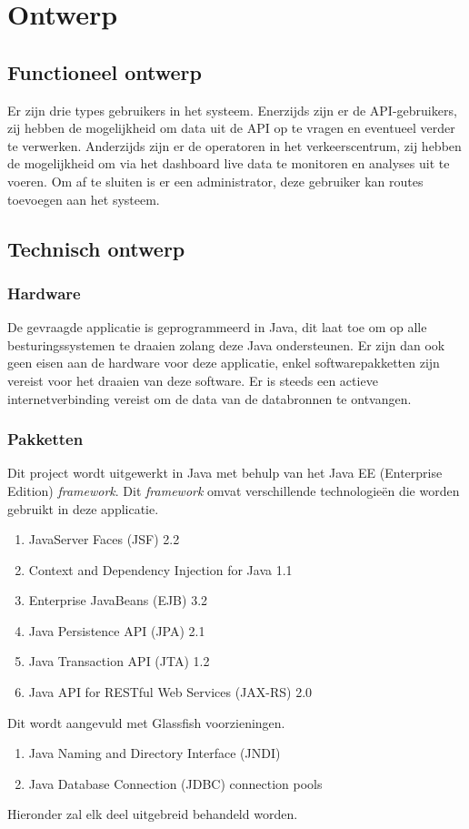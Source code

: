 \documentclass[ps,a4paper,oneside]{report}
\begin{document}
\chapter{Ontwerp}
\section{Functioneel ontwerp}
Er zijn drie types gebruikers in het systeem. Enerzijds zijn er de API-gebruikers, zij hebben de mogelijkheid om data uit de API op te vragen en eventueel verder te verwerken. Anderzijds zijn er de operatoren in het verkeerscentrum, zij hebben de mogelijkheid om via het dashboard live data te monitoren en analyses uit te voeren. Om af te sluiten is er een administrator, deze gebruiker kan routes toevoegen aan het systeem.
\section{Technisch ontwerp}
\subsection{Hardware}
De gevraagde applicatie is geprogrammeerd in Java, dit laat toe om op alle besturingssystemen te draaien zolang deze Java ondersteunen. Er zijn dan ook geen eisen aan de hardware voor deze applicatie, enkel softwarepakketten zijn vereist voor het draaien van deze software. Er is steeds een actieve internetverbinding vereist om de data van de databronnen te ontvangen.
\subsection{Pakketten}
Dit project wordt uitgewerkt in Java met behulp van het Java EE (Enterprise Edition) \textit{framework}. Dit \textit{framework} omvat verschillende technologie\"en die worden gebruikt in deze applicatie.
\begin{enumerate}	
	\item JavaServer Faces (JSF) 2.2
	\item Context and Dependency Injection for Java 1.1
	\item Enterprise JavaBeans (EJB) 3.2
	\item Java Persistence API (JPA) 2.1
	\item Java Transaction API (JTA) 1.2
	\item Java API for RESTful Web Services (JAX-RS) 2.0
\end{enumerate}
Dit wordt aangevuld met Glassfish voorzieningen.
\begin{enumerate}
	\item Java Naming and Directory Interface (JNDI)
	\item Java Database Connection (JDBC) connection pools
\end{enumerate}
Hieronder zal elk deel uitgebreid behandeld worden.
\end{document}
